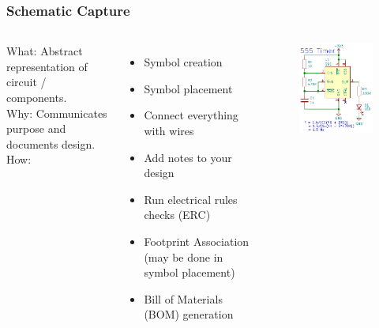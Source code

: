 \documentclass[aspectratio=169, t]{beamer}
\begin{document}
\begin{frame}
\frametitle{Schematic Capture}
\begin{columns}
	What: Abstract representation of circuit / components.\\
	Why: Communicates purpose and documents design.\\
	How:
	\begin{itemize}
		\item Symbol creation
		\item Symbol placement
		\item Connect everything with wires
		\item Add notes to your design
		\item Run electrical rules checks (ERC)
		\item Footprint Association (may be done in symbol placement)
		\item Bill of Materials (BOM) generation 
	\end{itemize}
	
	\vspace{-8mm}
	\begin{figure}
		\includegraphics[width=\linewidth]{images/555-schematic.png}
	\end{figure}
\end{columns}
\end{frame}
\end{document}
